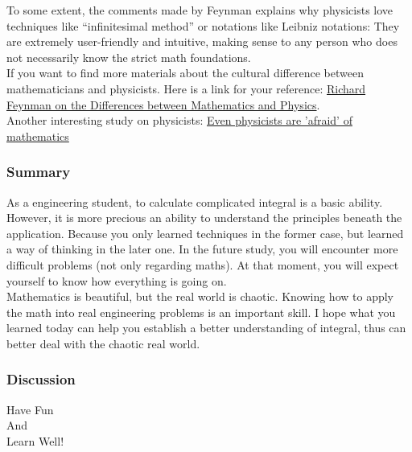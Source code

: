 \documentclass[11pt, t]{beamer}
\newcommand{\nullspace}{~\\[15pt]}
\begin{document}
\begin{frame}[allowframebreaks]
    \newpage
    To some extent, the comments made by Feynman explains why physicists love techniques like ``infinitesimal method'' or notations like Leibniz notations: They are extremely user-friendly and intuitive, making sense to any person who does not necessarily know the strict math foundations. \nullspace
    If you want to find more materials about the cultural difference between mathematicians and physicists. Here is a link for your reference:
    \href{https://medium.com/cantors-paradise/richard-feynman-on-the-differences-between-mathematics-and-physics-c0847e8a3d75}{Richard Feynman on the Differences between Mathematics and Physics}.
    \nullspace
    Another interesting study on physicists: \href{https://phys.org/news/2016-11-physicists-mathematics.html}{Even physicists are 'afraid' of mathematics}
\end{frame}

\begin{frame}
    \frametitle{Summary}
    As a engineering student, to calculate complicated integral is a basic ability. However, it is more precious an ability to understand the principles beneath the application. Because you only learned techniques in the former case, but learned a way of thinking in the later one. In the future study, you will encounter more difficult problems (not only regarding maths). At that moment, you will expect yourself to know how everything is going on. \nullspace
    
    Mathematics is beautiful, but the real world is chaotic. Knowing how to apply the math into real engineering problems is an important skill. I hope what you learned today can help you establish a better understanding of integral, thus can better deal with the chaotic real world.
    \nullspace    

\end{frame}


\begin{frame}
    \frametitle{Discussion}
    \vspace{1cm}
    \begin{center}
        \LARGE
        Have Fun\\
        And\\
        Learn Well!
    \end{center}
\end{frame}
\end{document}
